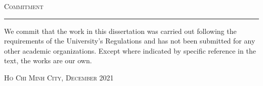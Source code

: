 \thispagestyle{empty}
\vspace*{3cm}
\noindent\Huge\textsc{Commitment}\\
\normalsize
\noindent\rule[2pt]{\textwidth}{0.8pt}
\hspace*{5cm}


We commit that the work in this dissertation was carried out following the requirements of the University’s Regulations and has not been submitted for any other academic organizations. Except where indicated by specific reference in the text, the works are our own.
	
	\hfill \textsc{Ho Chi Minh City, December 2021}
	
\cleardoublepage
